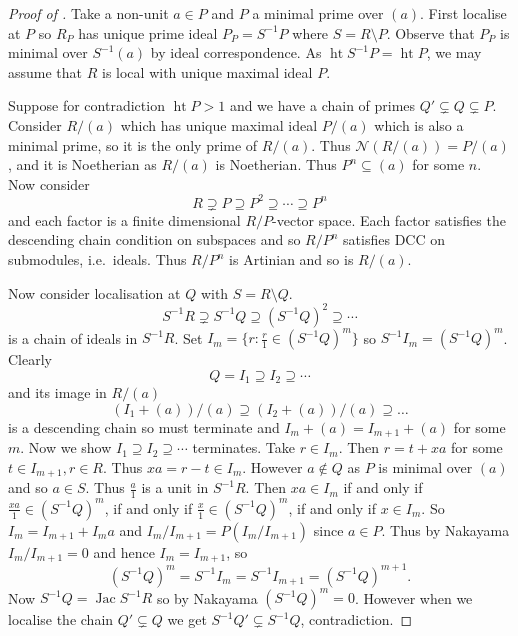 \documentclass[a4paper]{article}
\newcommand{\nilrad}[1]{\mathcal{N}({#1})} %
\DeclareMathOperator{\jac}{Jac} %
\DeclareMathOperator{\htt}{ht} %
\begin{document}
\begin{proof}[Proof of ]
  Take a non-unit \(a \in P\) and \(P\) a minimal prime over \((a)\). First localise at \(P\) so \(R_P\) has unique prime ideal \(P_P = S^{-1}P\) where \(S = R\setminus P\). Observe that \(P_P\) is minimal over \(S^{-1}(a)\) by ideal correspondence. As \(\htt S^{-1}P = \htt P\), we may assume that \(R\) is local with unique maximal ideal \(P\).

  Suppose for contradiction \(\htt P > 1\) and we have a chain of primes \(Q' \subsetneq Q \subsetneq P\). Consider \(R/(a)\) which has unique maximal ideal \(P/(a)\) which is also a minimal prime, so it is the only prime of \(R/(a)\). Thus \(\nilrad{R/(a)} = P/(a)\), and it is Noetherian as \(R/(a)\) is Noetherian. Thus \(P^n \subseteq (a)\) for some \(n\). Now consider
  \[
    R \supsetneq P \supseteq P^2 \supseteq \cdots \supseteq P^n
  \]
  and each factor is a finite dimensional \(R/P\)-vector space. Each factor satisfies the descending chain condition on subspaces and so \(R/P^n\) satisfies DCC on submodules, i.e.\ ideals. Thus \(R/P^n\) is Artinian and so is \(R/(a)\).

  Now consider localisation at \(Q\) with \(S = R\setminus Q\).
  \[
    S^{-1}R \supsetneq S^{-1}Q \supseteq (S^{-1}Q)^2 \supseteq \cdots
  \]
  is a chain of ideals in \(S^{-1}R\). Set \(I_m = \{r: \frac{r}{1} \in (S^{-1}Q)^m\}\) so \(S^{-1}I_m = (S^{-1}Q)^m\). Clearly
  \[
    Q = I_1 \supseteq I_2 \supseteq \cdots
  \]
  and its image in \(R/(a)\)
  \[
    (I_1 + (a))/(a) \supseteq (I_2 + (a))/(a) \supseteq \dots
  \]
  is a descending chain so must terminate and \(I_m + (a) = I_{m + 1} + (a)\) for some \(m\). Now we show \(I_1 \supseteq I_2 \supseteq \cdots\) terminates. Take \(r \in I_m\). Then \(r = t + xa\) for some \(t \in I_{m + 1}, r \in R\). Thus \(xa = r - t \in I_m\). However \(a \notin Q\) as \(P\) is minimal over \((a)\) and so \(a \in S\). Thus \(\frac{a}{1}\) is a unit in \(S^{-1}R\). Then \(xa \in I_m\) if and only if \(\frac{xa}{1} \in (S^{-1}Q)^m\), if and only if \(\frac{x}{1} \in (S^{-1}Q)^m\), if and only if \(x \in I_m\). So \(I_m = I_{m + 1} + I_ma\) and \(I_m/I_{m + 1} = P(I_m/I_{m + 1})\) since \(a \in P\). Thus by Nakayama \(I_m/I_{m + 1} = 0\) and hence \(I_m = I_{m + 1}\), so
  \[
    (S^{-1}Q)^m = S^{-1}I_m = S^{-1}I_{m + 1} = (S^{-1}Q)^{m + 1}.
  \]
  Now \(S^{-1}Q = \jac{S^{-1}R}\) so by Nakayama \((S^{-1}Q)^m = 0\). However when we localise the chain \(Q' \subsetneq Q\) we get \(S^{-1}Q' \subsetneq S^{-1}Q\), contradiction.
\end{proof}
\end{document}
